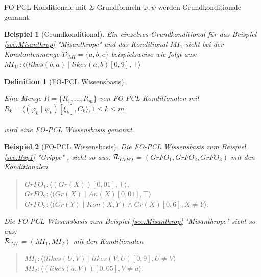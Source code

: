 \documentclass[draft]{scrreprt}
\newtheorem{Def}{Definition }[section]
\newtheorem{Bsp}{Beispiel}[section]
\begin{document}
FO-PCL-Konditionale mit $ \Sigma $-Grundformeln $ \varphi, \psi $ werden Grundkonditionale genannt. \label{Grundkonditional}

\begin{Bsp}[Grundkonditional]
	Ein einzelnes Grundkonditional für das Beispiel \ref{sec:Misanthrop} "{}Misanthrope"{} und das Konditional $ MI_1 $ sieht bei der Konstantenmenge $ \cal{D} $$_{MI} = \{ a, b, c\} $ beispielsweise wie folgt aus:\\
	$ MI_{11} : \langle (likes(b, a) \mid likes(a, b
	)[0,9], \top \rangle $\\
	
\end{Bsp}

\begin{Def}[FO-PCL Wissensbasis]\cite[S. 6]{Fis12}  \label{KB}

\noindent
Eine Menge $ R = \{R_1, ..., R_m\} $ von FO-PCL Konditionalen mit\\

 $ R_k =  \langle(\varphi_k \mid \psi_k)[\xi_k], C_k \rangle , 1 \leq k \leq m $ \\
\\wird eine FO-PCL Wissensbasis genannt.
\end{Def}

\begin{Bsp}[FO-PCL Wissensbasis]
Die FO-PCL Wissensbasis zum Beispiel\\ \ref{sec:Bsp1} "{}Grippe"{} ,
sieht so aus: $ \cal{R} $$_{GrFO}  $ = $ (GrFO_1, GrFO_2, GrFO_3)  $ mit den Konditionalen 
\begin{quote}
$ GrFO_{1}  :  \langle (Gr(X))[0,01], \top \rangle $,\\
$ GrFO_{2} : \langle (Gr(X) \mid An(X)[0,01], \top \rangle$\\
$ GrFO_{3} : \langle (Gr(Y) \mid Kon(X, Y) \wedge Gr(X )[0,6], X \neq Y \rangle$.\\
\end{quote}
Die FO-PCL Wissensbasis zum Beispiel \ref{sec:Misanthrop} "{}Misanthrope"{} sieht so aus:\\
 $ \cal{R} $$_{MI}  $ = $ (MI_1, MI_2)  $  mit den Konditionalen 
\begin{quote}
	$ MI_1 : \langle (likes(U, V) \mid likes(V, U)[0,9], U \neq V \rangle$\\
	$ MI_2 : \langle (likes(a, V))[0,05], V \neq a \rangle$.\\
\end{quote}
 	
\end{Bsp}
\end{document}
